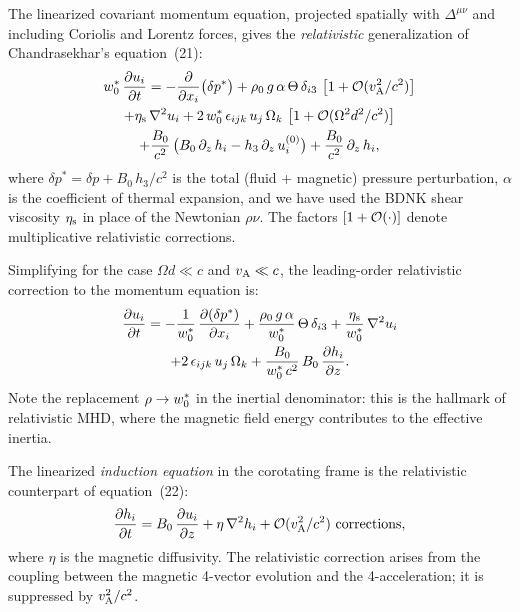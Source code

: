 The linearized covariant momentum equation, projected spatially with
$\Delta^{\mu\nu}$ and including Coriolis and Lorentz forces, gives
the \emph{relativistic} generalization of Chandrasekhar's
equation~(21):
\begin{multline}
  w^{*}_{0}\,\frac{\partial u_{i}}{\partial t}
  = -\frac{\partial}{\partial x_{i}}\bigl(\delta p^{*}\bigr)
  + \rho_{0}\,g\,\alpha\,\Theta\,\delta_{i3}\,
    \left[1 + \mathcal{O}(v_{\mathrm{A}}^{2}/c^{2})\right]\\
  + \eta_{\mathrm{s}}\,\nabla^{2}u_{i}
  + 2\,w^{*}_{0}\,\epsilon_{ijk}\,u_{j}\,\Omega_{k}\,
    \left[1 + \mathcal{O}(\Omega^{2}d^{2}/c^{2})\right]\\
  + \frac{B_{0}}{c^{2}}\,
    \bigl(B_{0}\,\partial_{z}\,h_{i} - h_{3}\,\partial_{z}\,u_{i}^{(0)}\bigr)
  + \frac{B_{0}}{c^{2}}\,\partial_{z}\,h_{i},
  \label{eq:rel51-momentum}
\end{multline}
where $\delta p^{*} = \delta p + B_{0}\,h_{3}/c^{2}$ is the total
(fluid + magnetic) pressure perturbation, $\alpha$ is the coefficient
of thermal expansion, and we have used the BDNK shear
viscosity $\eta_{\mathrm{s}}$ in place of the Newtonian $\rho\nu$.  The
factors $\left[1 + \mathcal{O}(\cdot)\right]$ denote multiplicative relativistic
corrections.

Simplifying for the case $\Omega d \ll c$ and $v_{\mathrm{A}} \ll c$, the
leading-order relativistic correction to the momentum equation is:
\begin{multline}
  \frac{\partial u_{i}}{\partial t}
  = -\frac{1}{w^{*}_{0}}\,
    \frac{\partial(\delta p^{*})}{\partial x_{i}}
  + \frac{\rho_{0}\,g\,\alpha}{w^{*}_{0}}\,\Theta\,\delta_{i3}
  + \frac{\eta_{\mathrm{s}}}{w^{*}_{0}}\,\nabla^{2}u_{i}\\
  + 2\,\epsilon_{ijk}\,u_{j}\,\Omega_{k}
  + \frac{B_{0}}{w^{*}_{0}\,c^{2}}\,
    B_{0}\,\frac{\partial h_{i}}{\partial z}.
  \label{eq:rel51-mom-simple}
\end{multline}
Note the replacement $\rho \to w^{*}_{0}$ in the inertial
denominator: this is the hallmark of relativistic MHD, where the
magnetic field energy contributes to the effective inertia.

The linearized \emph{induction equation} in the corotating frame is
the relativistic counterpart of equation~(22):
\begin{equation}
  \frac{\partial h_{i}}{\partial t}
  = B_{0}\,\frac{\partial u_{i}}{\partial z}
  + \eta\,\nabla^{2}h_{i}
  + \mathcal{O}(v_{\mathrm{A}}^{2}/c^{2})\text{ corrections},
  \label{eq:rel51-induction}
\end{equation}
where $\eta$ is the magnetic diffusivity.  The relativistic
correction arises from the coupling between the magnetic 4-vector
evolution and the 4-acceleration; it is suppressed by $v_{\mathrm{A}}^{2}/c^{2}$.


